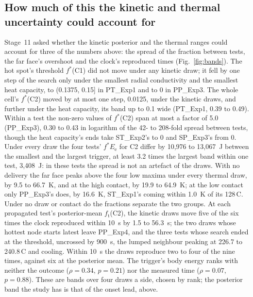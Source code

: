 \documentclass[preprint,12pt]{elsarticle}
\newcommand{\degC}{\,\textdegree C}
\newcommand{\fs}{f^{*}}
\newcommand{\ft}{f_{\mathrm{t}}}
\newcommand{\Ee}{E_{\mathrm{e}}}
\begin{document}
\subsection{How much of this the kinetic and thermal uncertainty could account for}
\label{sec:res-bands}

Stage~11 asked whether the kinetic posterior and the thermal ranges could account for three of the numbers above: the spread of the fraction between tests, the far face's overshoot and the clock's reproduced times (Fig.~\ref{fig:bands}). The hot spot's threshold $\fs$(C1) did not move under any kinetic draw; it fell by one step of the search only under the smallest radial conductivity and the smallest heat capacity, to (0.1375, 0.15] in PT\_Exp1 and to 0 in PP\_Exp3. The whole cell's $\fs$(C2) moved by at most one step, 0.0125, under the kinetic draws, and further under the heat capacity, its band up to 0.1 wide (PT\_Exp1, 0.39 to 0.49). Within a test the non-zero values of $\fs$(C2) span at most a factor of 5.0 (PP\_Exp3), 0.30 to 0.43 in logarithm of the 42- to 208-fold spread between tests, though the heat capacity's ends take ST\_Exp2's to 0 and SP\_Exp3's from 0. Under every draw the four tests' $\fs\Ee$ for C2 differ by 10,976 to 13,067~J between the smallest and the largest trigger, at least 3.2 times the largest band within one test, 3,408~J: in these tests the spread is not an artefact of the draws. With no delivery the far face peaks above the four low maxima under every thermal draw, by 9.5 to 66.7~K, and at the high contact, by 19.9 to 64.9~K; at the low contact only PP\_Exp3's does, by 16.6~K, ST\_Exp1's coming within 1.0~K of its 128\degC. Under no draw or contact do the fractions separate the two groups. At each propagated test's posterior-mean $\ft$(C2), the kinetic draws move five of the six times the clock reproduced within 10~s by 1.5 to 56.3~s; the two draws whose hottest node starts latest leave PP\_Exp4, and the three tests whose search ended at the threshold, uncrossed by 900~s, the lumped neighbour peaking at 226.7 to 240.8\degC{} and cooling. Within 10~s the draws reproduce two to four of the nine times, against six at the posterior mean. The trigger's body energy ranks with neither the outcome ($\rho=0.34$, $p=0.21$) nor the measured time ($\rho=0.07$, $p=0.88$). These are bands over four draws a side, chosen by rank; the posterior band the study has is that of the onset lead, above.
\end{document}

